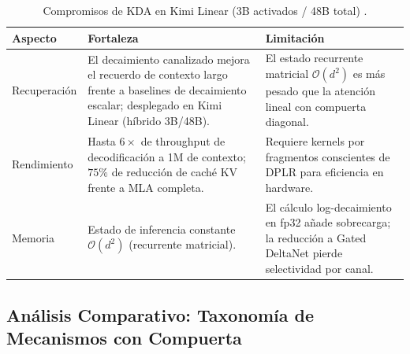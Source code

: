\begin{table}[H]
\centering
\footnotesize
\begin{tabularx}{\linewidth}{lXX}
\toprule
\textbf{Aspecto} & \textbf{Fortaleza} & \textbf{Limitación} \\
\midrule
Recuperación & El decaimiento canalizado mejora el recuerdo de contexto largo frente a baselines de decaimiento escalar; desplegado en Kimi Linear (híbrido 3B/48B). & El estado recurrente matricial $\mathcal{O}(d^2)$ es más pesado que la atención lineal con compuerta diagonal. \\
Rendimiento & Hasta $6\times$ de throughput de decodificación a 1M de contexto; $75\%$ de reducción de caché KV frente a MLA completa. & Requiere kernels por fragmentos conscientes de DPLR para eficiencia en hardware. \\
Memoria & Estado de inferencia constante $\mathcal{O}(d^2)$ (recurrente matricial). & El cálculo log-decaimiento en fp32 añade sobrecarga; la reducción a Gated DeltaNet pierde selectividad por canal. \\
\bottomrule
\end{tabularx}
\caption{Compromisos de KDA en Kimi Linear (3B activados / 48B total) \citep{kimi_kda_2025}.}
\label{tab:kda-tradeoffs-es}
\end{table}

\normalsize

\subsection{Análisis Comparativo: Taxonomía de Mecanismos con Compuerta}

